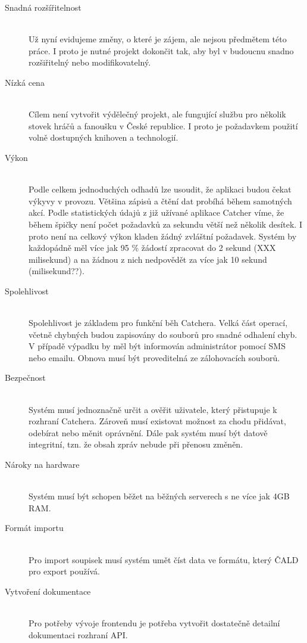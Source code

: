 \documentclass[thesis=B,czech]{FITthesis}[2012/06/26]
\begin{document}
\begin{description}
  \item[Snadná rozšířitelnost] \hfill \\
  Už nyní evidujeme změny, o které je zájem, ale nejsou předmětem této práce.
  I proto je nutné projekt dokončit tak, aby byl v budoucnu snadno rozšiřitelný nebo
  modifikovatelný.

  \item[Nízká cena] \hfill \\
  Cílem není vytvořit výdělečný projekt, ale fungující službu pro několik stovek hráčů
  a fanoušku v České republice. I proto je požadavkem použití volně dostupných
  knihoven a technologií.

  \item[Výkon] \hfill \\
  Podle celkem jednoduchých odhadů lze usoudit, že aplikaci budou čekat výkyvy v provozu.
  Většina zápisů a čtění dat probíhá během samotných akcí. Podle statistických údajů
  z již užívané aplikace Catcher víme, že během špičky není počet požadavků za sekundu
  větší než několik desítek. I proto není na celkový výkon kladen žádný zvláštní požadavek.
  Systém by každopádně měl více jak 95 \% žádostí zpracovat do 2 sekund (XXX milisekund) a na žádnou z nich
  nedpovědět za více jak 10 sekund (milisekund??).

  \item[Spolehlivost] \hfill \\
  Spolehlivost je základem pro funkční běh Catchera. Velká část operací, včetně chybných budou
  zapisovány do souborů pro snadné odhalení chyb. V případě výpadku by měl být informován
  administrátor pomocí SMS nebo emailu. Obnova musí být proveditelná ze zálohovacích souborů.
  
  
  \item[Bezpečnost] \hfill \\
  Systém musí jednoznačně určit a ověřit uživatele, který přistupuje k rozhraní Catchera. Zároveň
  musí existovat možnost za chodu přidávat, odebírat nebo měnit oprávnění. Dále pak systém musí
  být datově integritní, tzn. že obsah zpráv nebude při přenosu změněn.

  \item[Nároky na hardware] \hfill \\
  Systém musí být schopen běžet na běžných serverech s ne více jak 4GB RAM.

  \item[Formát importu] \hfill \\
  Pro import soupisek musí systém umět číst data ve formátu, který ČALD pro export používá.
  
  \item[Vytvoření dokumentace] \hfill \\
  Pro potřeby vývoje frontendu je potřeba vytvořit dostatečně detailní dokumentaci rozhraní API.
\end{description}
\end{document}
